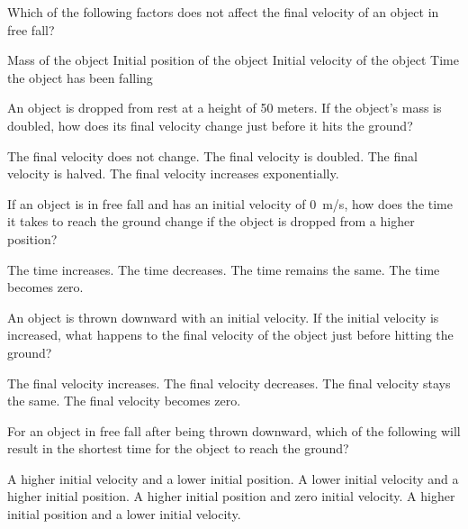 \documentclass[]{exam}
\theoremstyle{definition}
\begin{document}
\begin{questions}
\question
Which of the following factors does not affect the final velocity of an object in free fall?

\begin{randomizechoices}
\correctchoice Mass of the object
\choice Initial position of the object
\choice Initial velocity of the object
\choice Time the object has been falling
\end{randomizechoices}

\question
An object is dropped from rest at a height of 50 meters. If the object’s mass is doubled, how does its final velocity change just before it hits the ground?

\begin{randomizechoices}
\correctchoice The final velocity does not change.
\choice The final velocity is doubled.
\choice The final velocity is halved.
\choice The final velocity increases exponentially.
\end{randomizechoices}

\question
If an object is in free fall and has an initial velocity of \SI{0}{m/s}, how does the time it takes to reach the ground change if the object is dropped from a higher position?

\begin{randomizechoices}
\correctchoice The time increases.
\choice The time decreases.
\choice The time remains the same.
\choice The time becomes zero.
\end{randomizechoices}


\question
An object is thrown downward with an initial velocity. If the initial velocity is increased, what happens to the final velocity of the object just before hitting the ground?

\begin{randomizechoices}
\correctchoice The final velocity increases.
\choice The final velocity decreases.
\choice The final velocity stays the same.
\choice The final velocity becomes zero.
\end{randomizechoices}

\question
For an object in free fall after being thrown downward, which of the following will result in the shortest time for the object to reach the ground?

\begin{randomizechoices}
\correctchoice A higher initial velocity and a lower initial position.
\choice A lower initial velocity and a higher initial position.
\choice A higher initial position and zero initial velocity.
\choice A higher initial position and a lower initial velocity.
\end{randomizechoices}
\end{questions}
\end{document}

